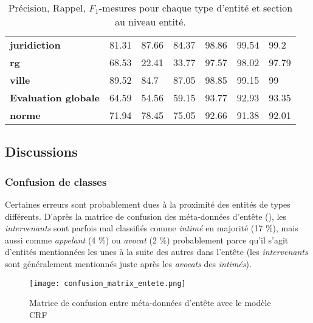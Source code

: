 \begin{table}[!ht]
\begin{tabular}{|l|l|l|l|l|l|l|}
		\textbf{juridiction}   & 81.31              & 87.66           & 84.37       & 98.86              & 99.54           & 99.2        \\ 
		\textbf{rg}            & 68.53              & 22.41           & 33.77       & 97.57              & 98.02           & 97.79       \\ 
		\textbf{ville}         & 89.52              & 84.7            & 87.05       & 98.85              & 99.15           & 99          \\ \hline
		\textbf{Evaluation globale} & 64.59              & 54.56           & 59.15       & 93.77              & 92.93           & 93.35       \\ \hline
				\noalign{\smallskip}\hline\noalign{\smallskip}
		\textbf{norme}         & 71.94              & 78.45           & 75.05       & 92.66              & 91.38           & 92.01       \\ \hline
	\end{tabular}
	\caption{Précision, Rappel, $F_1$-mesures pour chaque type d'entité et section au niveau entité.}\label{tab:structuration:perf-detail-entity}
\end{table}

\subsection{Discussions}
\subsubsection{Confusion de classes}
Certaines erreurs sont probablement dues à la proximité des entités de types différents. D'après la matrice de confusion des méta-données d'entête (), les \textit{intervenants} sont parfois mal classifiés comme \textit{intimé} en majorité (17 \%), mais aussi comme \textit{appelant} (4 \%) ou \textit{avocat} (2 \%) probablement parce qu'il s'agit d'entités mentionnées les unes à la suite des autres dans l'entête (les \textit{intervenants} sont généralement mentionnés juste après les \textit{avocats} des \textit{intimés}). 

\begin{figure}[!htb]
    \centering
    \texttt{[image: confusion\_matrix\_entete.png]}
    \caption{Matrice de confusion entre méta-données d'entête avec le modèle CRF}
    \label{fig:structuration:matrice-confusion-entete}
\end{figure}

